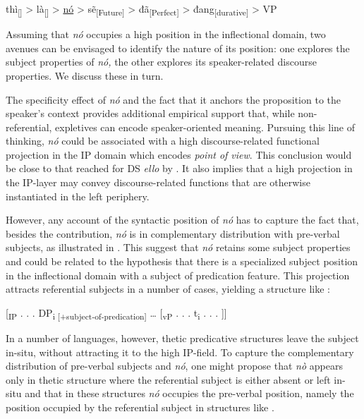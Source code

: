 \documentclass[output=paper]{LSP/langsci}
\begin{document}
\ea%
    \label{ex:Greco:24}
 thì\textsubscript{[]} > là\textsubscript{[]}  > \uline{nó}  >   sẽ\textsubscript{[Future]} > đã\textsubscript{[Perfect]} > đang\textsubscript{[durative]}  > VP
\z

Assuming that \textit{nó} occupies a high position in the inflectional domain, two avenues can be envisaged to identify the nature of its position: one explores the subject properties of \textit{nó,}  the other explores its speaker-related discourse properties. We discuss these in turn.

The specificity effect of \textit{nó} and the fact that it anchors the proposition to the speaker’s context provides additional empirical support that, while non-refer\-en\-tial, expletives can encode speaker-oriented meaning. Pursuing this line of thinking, \textit{nó} could be associated with a high discourse-related functional projection in the IP domain which encodes \textit{point of view}. This conclusion would be close to that reached for DS \textit{ello} by \citet{GuptonEtAl2014}. It also implies that a high projection in the IP-layer may convey discourse-related functions that are otherwise instantiated in the left periphery.

However, any account of the syntactic position of \textit{nó} has to capture the fact that, besides the  contribution, \textit{nó} is in complementary distribution with pre-verbal subjects, as illustrated in . This suggest that \textit{nó} retains some subject properties and could be related to the hypothesis that there is a specialized subject position in the inflectional domain with a subject of predication feature. This projection attracts referential subjects in a number of cases, yielding a structure like :

\ea%
    \label{ex:Greco:25}
	[\textsubscript{IP} . . . DP\textsubscript{i [+subject-of-predication]} … [\textsubscript{vP} . . . t\textsubscript{i} . . . ]]
\z

In a number of languages, however, thetic predicative structures leave the subject in-situ, without attracting it to the high IP-field. To capture the complementary distribution of pre-verbal subjects and \textit{nó}, one might propose that \textit{nò} appears only in thetic structure where the referential subject is either absent or left in-situ and that in these structures \textit{nó} occupies the pre-verbal position, namely the position occupied by the referential subject in structures like .
\end{document}
